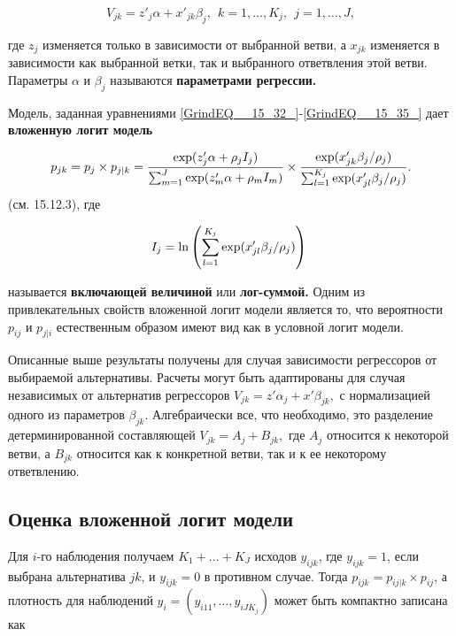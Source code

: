 \begin{equation} \label{GrindEQ__15_35_} V_{jk}=z'_j\alpha +x'_{jk}{\beta }_j,\ \ k=1,\dots ,K_j,\ \ j=1,\dots ,J, \end{equation} 

где $z_j$ изменяется только в зависимости от выбранной ветви, а $x_{jk}$ изменяется в зависимости как выбранной ветки, так и выбранного ответвления этой ветви. Параметры $\alpha $ и ${\beta }_j$ называются \textbf{параметрами регрессии.}

Модель, заданная уравнениями \eqref{GrindEQ__15_32_}-\eqref{GrindEQ__15_35_} дает \textbf{вложенную логит модель}

\begin{equation} 
\label{GrindEQ__15_36_} 
p_{jk}=
p_j\times p_{j|k}=
\frac{{\rm exp}(z'_j\alpha +{\rho }_jI_j)}{\sum^J_{m=1}{{\rm exp}(z'_m\alpha +{\rho }_mI_m)}}
\times 
\frac{{\rm exp}(x'_{jk}{\beta }_j/{\rho }_j)}{\sum^{K_j}_{l=1}{{\rm exp}(x'_{jl}{\beta }_j/{\rho }_j)}}. 
\end{equation} 
(см.  15.12.3), где

\begin{equation} \label{GrindEQ__15_37_} I_j={\ln  \left(\sum^{K_j}_{l=1}{{\rm exp}(x'_{jl}{\beta }_j/{\rho }_j)}\right)\ } \end{equation} 

называется \textbf{включающей величиной }или \textbf{лог-суммой. } Одним из привлекательных свойств вложенной логит модели является то, что вероятности $p_{ij}$ и $p_{j|i}$ естественным образом имеют вид как в условной логит модели.

Описанные выше результаты получены для случая зависимости регрессоров от выбираемой альтернативы. Расчеты могут быть адаптированы для случая независимых от альтернатив регрессоров $V_{jk}=z'{\alpha }_j+x'{\beta }_{jk},$ с нормализацией одного из параметров ${\beta }_{jk}$. Алгебраически все, что необходимо, это разделение детерминированной составляющей $V_{jk}=A_j+B_{jk},$ где $A_j$ относится к некоторой ветви, а $B_{jk}$ относится как к конкретной ветви, так и к ее некоторому ответвлению.

\subsection{Оценка вложенной логит модели}

Для $i$-го наблюдения получаем $K_1+\dots +K_J$ исходов $y_{ijk}$, где $y_{ijk}=1$, если выбрана альтернатива $jk$, и $y_{ijk}=0$ в противном случае. Тогда $p_{ijk}=p_{ij|k}\times p_{ij}$, а плотность  для наблюдений $y_i=(y_{i11},\dots ,y_{iJK_j})$ может быть компактно записана как

